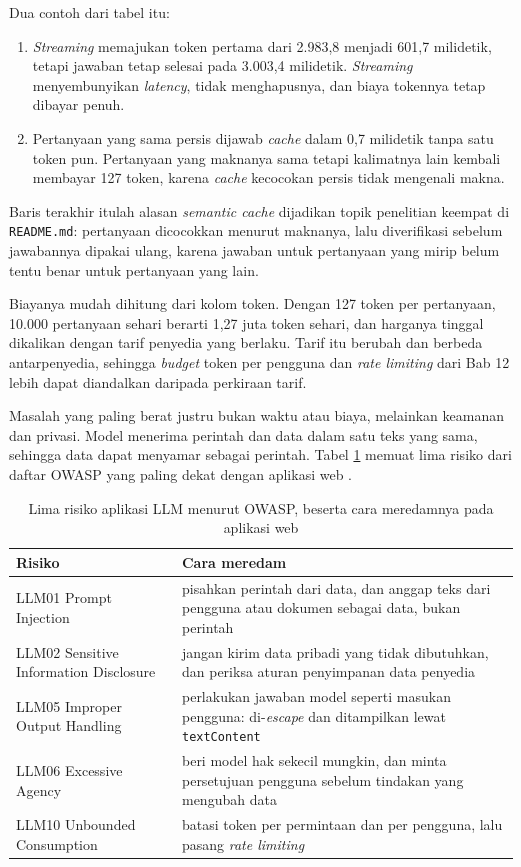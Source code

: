 Dua contoh dari tabel itu:
\begin{enumerate}
  \item \textit{Streaming} memajukan token pertama dari 2.983,8 menjadi 601,7
        milidetik, tetapi jawaban tetap selesai pada 3.003,4 milidetik.
        \textit{Streaming} menyembunyikan \textit{latency}, tidak
        menghapusnya, dan biaya tokennya tetap dibayar penuh.
  \item Pertanyaan yang sama persis dijawab \textit{cache} dalam 0,7
        milidetik tanpa satu token pun. Pertanyaan yang maknanya sama tetapi
        kalimatnya lain kembali membayar 127 token, karena \textit{cache}
        kecocokan persis tidak mengenali makna.
\end{enumerate}

Baris terakhir itulah alasan \textit{semantic cache} dijadikan topik
penelitian keempat di \texttt{README.md}: pertanyaan dicocokkan menurut
maknanya, lalu diverifikasi sebelum jawabannya dipakai ulang, karena jawaban
untuk pertanyaan yang mirip belum tentu benar untuk pertanyaan yang lain.

Biayanya mudah dihitung dari kolom token. Dengan 127 token per pertanyaan,
10.000 pertanyaan sehari berarti 1,27 juta token sehari, dan harganya tinggal
dikalikan dengan tarif penyedia yang berlaku. Tarif itu berubah dan berbeda
antarpenyedia, sehingga \textit{budget} token per pengguna dan
\textit{rate limiting} dari Bab 12 lebih dapat diandalkan daripada perkiraan
tarif.

Masalah yang paling berat justru bukan waktu atau biaya, melainkan keamanan
dan privasi. Model menerima perintah dan data dalam satu teks yang sama,
sehingga data dapat menyamar sebagai perintah. Tabel \ref{tab:risikollm14}
memuat lima risiko dari daftar OWASP yang paling dekat dengan aplikasi web
\cite{owasp-llm-top10}.

\begin{table}[!htb]
  \centering
  \caption{Lima risiko aplikasi LLM menurut OWASP, beserta cara meredamnya
           pada aplikasi web}
  \label{tab:risikollm14}
  \begin{tabularx}{\textwidth}{lX}
    \hline
    \textbf{Risiko} & \textbf{Cara meredam} \\
    \hline
    LLM01 Prompt Injection & pisahkan perintah dari data, dan anggap teks dari pengguna atau dokumen sebagai data, bukan perintah \\
    \hline
    LLM02 Sensitive Information Disclosure & jangan kirim data pribadi yang tidak dibutuhkan, dan periksa aturan penyimpanan data penyedia \\
    \hline
    LLM05 Improper Output Handling & perlakukan jawaban model seperti masukan pengguna: di-\textit{escape} dan ditampilkan lewat \texttt{textContent} \\
    \hline
    LLM06 Excessive Agency & beri model hak sekecil mungkin, dan minta persetujuan pengguna sebelum tindakan yang mengubah data \\
    \hline
    LLM10 Unbounded Consumption & batasi token per permintaan dan per pengguna, lalu pasang \textit{rate limiting} \\
    \hline
  \end{tabularx}
\end{table}

